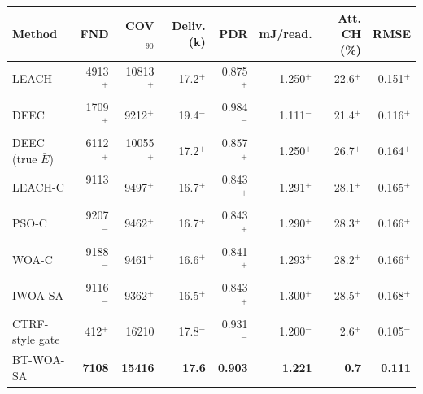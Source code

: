 \begin{tabular}{lrrrrrrr}
\toprule
Method & FND & COV$_{90}$ & Deliv. (k) & PDR & mJ/read. & Att. CH (\%) & RMSE \\
\midrule
LEACH & 4913$^{+}$ & 10813$^{+}$ & 17.2$^{+}$ & 0.875$^{+}$ & 1.250$^{+}$ & 22.6$^{+}$ & 0.151$^{+}$ \\
DEEC & 1709$^{+}$ & 9212$^{+}$ & 19.4$^{-}$ & 0.984$^{-}$ & 1.111$^{-}$ & 21.4$^{+}$ & 0.116$^{+}$ \\
DEEC (true $\bar{E}$) & 6112$^{+}$ & 10055$^{+}$ & 17.2$^{+}$ & 0.857$^{+}$ & 1.250$^{+}$ & 26.7$^{+}$ & 0.164$^{+}$ \\
LEACH-C & 9113$^{-}$ & 9497$^{+}$ & 16.7$^{+}$ & 0.843$^{+}$ & 1.291$^{+}$ & 28.1$^{+}$ & 0.165$^{+}$ \\
PSO-C & 9207$^{-}$ & 9462$^{+}$ & 16.7$^{+}$ & 0.843$^{+}$ & 1.290$^{+}$ & 28.3$^{+}$ & 0.166$^{+}$ \\
WOA-C & 9188$^{-}$ & 9461$^{+}$ & 16.6$^{+}$ & 0.841$^{+}$ & 1.293$^{+}$ & 28.2$^{+}$ & 0.166$^{+}$ \\
IWOA-SA & 9116$^{-}$ & 9362$^{+}$ & 16.5$^{+}$ & 0.843$^{+}$ & 1.300$^{+}$ & 28.5$^{+}$ & 0.168$^{+}$ \\
CTRF-style gate & 412$^{+}$ & 16210 & 17.8$^{-}$ & 0.931$^{-}$ & 1.200$^{-}$ & 2.6$^{+}$ & 0.105$^{-}$ \\
BT-WOA-SA & \textbf{7108} & \textbf{15416} & \textbf{17.6} & \textbf{0.903} & \textbf{1.221} & \textbf{0.7} & \textbf{0.111} \\
\bottomrule
\end{tabular}
